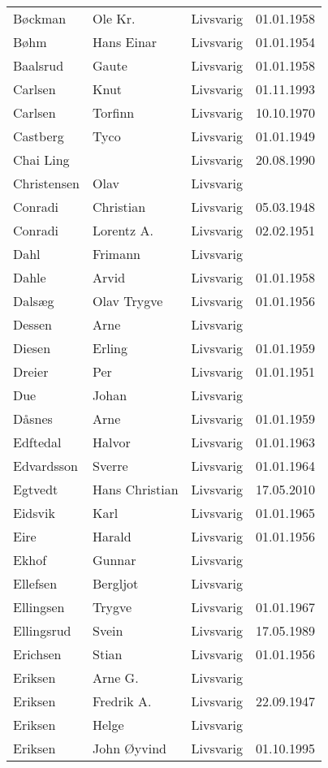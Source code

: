 \documentclass[fsbok.tex]{subfiles}
\begin{document}
\begin{longtable}{llll}
Bøckman	&	Ole Kr. 	&	Livsvarig 	&	01.01.1958	\\
Bøhm	&	Hans Einar	&	Livsvarig 	&	01.01.1954	\\
Baalsrud	&	Gaute	&	Livsvarig 	&	01.01.1958	\\
Carlsen	&	Knut	&	Livsvarig 	&	01.11.1993	\\
Carlsen	&	Torfinn	&	Livsvarig 	&	10.10.1970	\\
Castberg	&	Tyco	&	Livsvarig 	&	01.01.1949	\\
Chai Ling	&		&	Livsvarig 	&	20.08.1990	\\
Christensen	&	Olav	&	Livsvarig 	&		\\
Conradi	&	Christian	&	Livsvarig 	&	05.03.1948	\\
Conradi	&	Lorentz A.	&	Livsvarig 	&	02.02.1951	\\
Dahl	&	Frimann	&	Livsvarig 	&		\\
Dahle	&	Arvid	&	Livsvarig 	&	01.01.1958	\\
Dalsæg	&	Olav Trygve	&	Livsvarig 	&	01.01.1956	\\
Dessen	&	Arne	&	Livsvarig 	&		\\
Diesen	&	Erling	&	Livsvarig 	&	01.01.1959	\\
Dreier	&	Per	&	Livsvarig 	&	01.01.1951	\\
Due	&	Johan	&	Livsvarig 	&		\\
Dåsnes	&	Arne	&	Livsvarig 	&	01.01.1959	\\
Edftedal	&	Halvor	&	Livsvarig 	&	01.01.1963	\\
Edvardsson	&	Sverre	&	Livsvarig 	&	01.01.1964	\\
Egtvedt	&	Hans Christian	&	Livsvarig	&	17.05.2010	\\
Eidsvik	&	Karl	&	Livsvarig 	&	01.01.1965	\\
Eire	&	Harald	&	Livsvarig 	&	01.01.1956	\\
Ekhof	&	Gunnar	&	Livsvarig 	&		\\
Ellefsen	&	Bergljot	&	Livsvarig 	&		\\
Ellingsen	&	Trygve	&	Livsvarig 	&	01.01.1967	\\
Ellingsrud	&	Svein	&	Livsvarig 	&	17.05.1989	\\
Erichsen	&	Stian	&	Livsvarig 	&	01.01.1956	\\
Eriksen	&	Arne G.	&	Livsvarig 	&		\\
Eriksen	&	Fredrik A.	&	Livsvarig 	&	22.09.1947	\\
Eriksen	&	Helge	&	Livsvarig 	&		\\
Eriksen 	&	John Øyvind	&	Livsvarig	&	01.10.1995	\\

\end{longtable}
\end{document}

